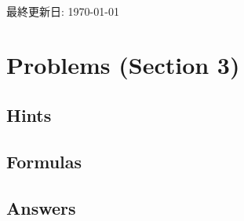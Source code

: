 

\usepackage[color]{showkeys}
\usepackage{afterpage}
\pagestyle{fancy}%
\fancyhead[L]{\textsc{\rightmark}}%
%  
\fancyhead[R]{\thepage}
\fancyfoot{}%
\renewcommand{\contentsname}{Contents}%
\newcommand{\toi}[1]{\noindent\fbox{\large\color{blue}{#1}}\\\nopagebreak}
\newcommand{\itemlabel}[1]{\noindent\uline{#1}}


\nocite{*}

\hrulefill\\

\begin{flushright}%
  最終更新日: \today
\end{flushright}%


\setcounter{section}{2}
\section{Problems (Section 3)}

\subsection{Hints}


\clearpage
\subsection{Formulas}


\clearpage
\subsection{Answers}





